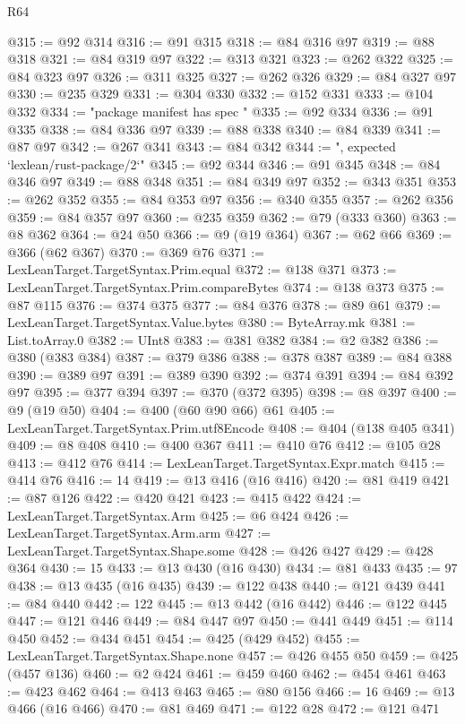 \begin{lexlean}{R64}
\begin{coremodule}
@315 := @92 @314
@316 := @91 @315
@318 := @84 @316 @97
@319 := @88 @318
@321 := @84 @319 @97
@322 := @313 @321
@323 := @262 @322
@325 := @84 @323 @97
@326 := @311 @325
@327 := @262 @326
@329 := @84 @327 @97
@330 := @235 @329
@331 := @304 @330
@332 := @152 @331
@333 := @104 @332
@334 := "package manifest has spec "
@335 := @92 @334
@336 := @91 @335
@338 := @84 @336 @97
@339 := @88 @338
@340 := @84 @339
@341 := @87 @97
@342 := @267 @341
@343 := @84 @342
@344 := ", expected `lexlean/rust-package/2`"
@345 := @92 @344
@346 := @91 @345
@348 := @84 @346 @97
@349 := @88 @348
@351 := @84 @349 @97
@352 := @343 @351
@353 := @262 @352
@355 := @84 @353 @97
@356 := @340 @355
@357 := @262 @356
@359 := @84 @357 @97
@360 := @235 @359
@362 := @79 (@333 @360)
@363 := @8 @362
@364 := @24 @50
@366 := @9 (@19 @364)
@367 := @62 @66
@369 := @366 (@62 @367)
@370 := @369 @76
@371 := LexLeanTarget.TargetSyntax.Prim.equal
@372 := @138 @371
@373 := LexLeanTarget.TargetSyntax.Prim.compareBytes
@374 := @138 @373
@375 := @87 @115
@376 := @374 @375
@377 := @84 @376
@378 := @89 @61
@379 := LexLeanTarget.TargetSyntax.Value.bytes
@380 := ByteArray.mk
@381 := List.toArray.{0}
@382 := UInt8
@383 := @381 @382
@384 := @2 @382
@386 := @380 (@383 @384)
@387 := @379 @386
@388 := @378 @387
@389 := @84 @388
@390 := @389 @97
@391 := @389 @390
@392 := @374 @391
@394 := @84 @392 @97
@395 := @377 @394
@397 := @370 (@372 @395)
@398 := @8 @397
@400 := @9 (@19 @50)
@404 := @400 (@60 @90 @66) @61
@405 := LexLeanTarget.TargetSyntax.Prim.utf8Encode
@408 := @404 (@138 @405 @341)
@409 := @8 @408
@410 := @400 @367
@411 := @410 @76
@412 := @105 @28
@413 := @412 @76
@414 := LexLeanTarget.TargetSyntax.Expr.match
@415 := @414 @76
@416 := 14
@419 := @13 @416 (@16 @416)
@420 := @81 @419
@421 := @87 @126
@422 := @420 @421
@423 := @415 @422
@424 := LexLeanTarget.TargetSyntax.Arm
@425 := @6 @424
@426 := LexLeanTarget.TargetSyntax.Arm.arm
@427 := LexLeanTarget.TargetSyntax.Shape.some
@428 := @426 @427
@429 := @428 @364
@430 := 15
@433 := @13 @430 (@16 @430)
@434 := @81 @433
@435 := 97
@438 := @13 @435 (@16 @435)
@439 := @122 @438
@440 := @121 @439
@441 := @84 @440
@442 := 122
@445 := @13 @442 (@16 @442)
@446 := @122 @445
@447 := @121 @446
@449 := @84 @447 @97
@450 := @441 @449
@451 := @114 @450
@452 := @434 @451
@454 := @425 (@429 @452)
@455 := LexLeanTarget.TargetSyntax.Shape.none
@457 := @426 @455 @50
@459 := @425 (@457 @136)
@460 := @2 @424
@461 := @459 @460
@462 := @454 @461
@463 := @423 @462
@464 := @413 @463
@465 := @80 @156
@466 := 16
@469 := @13 @466 (@16 @466)
@470 := @81 @469
@471 := @122 @28
@472 := @121 @471

\end{coremodule}
\end{lexlean}
